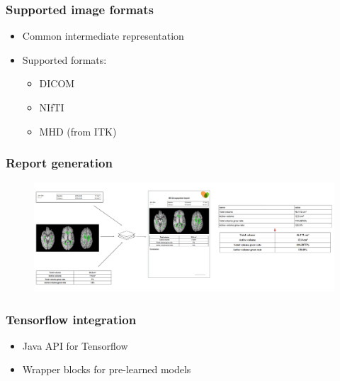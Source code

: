 \documentclass[xetex,mathserif,serif]{beamer}
\begin{document}
\begin{frame}
	\frametitle{Supported image formats}
	\begin{itemize}
		\item Common intermediate representation
		\item Supported formats:
			\begin{itemize}
				\item DICOM
				\item NIfTI
				\item MHD (from ITK)
			\end{itemize}
	\end{itemize}
 \end{frame}

  \begin{frame}
     \frametitle{Report generation}
        \begin{figure}[b]
             \centering
             \includegraphics[width=12cm]{pictures/reports.png}
         \end{figure}
 \end{frame}
 
 \begin{frame}
     \frametitle{Tensorflow integration}
        \begin{itemize}
             \item Java API for Tensorflow
             \item Wrapper blocks for pre-learned models
         \end{itemize}
 \end{frame}
 
\end{document}
